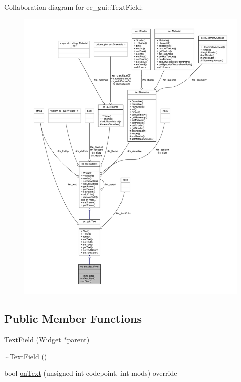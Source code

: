 Collaboration diagram for ec\+\_\+gui\+:\+:Text\+Field\+:\nopagebreak
\begin{figure}[H]
\begin{center}
\leavevmode
\includegraphics[width=350pt]{classec__gui_1_1_text_field__coll__graph}
\end{center}
\end{figure}
\subsection*{Public Member Functions}
\begin{DoxyCompactItemize}
\item 
\mbox{\hyperlink{classec__gui_1_1_text_field_a82c3e427aaa37f5a53a7561ef3d2e58e}{Text\+Field}} (\mbox{\hyperlink{classec__gui_1_1_widget}{Widget}} $\ast$parent)
\item 
\mbox{\hyperlink{classec__gui_1_1_text_field_a9c43ada308dc59b5a8728cc08cd8d8cb}{$\sim$\+Text\+Field}} ()
\item 
bool \mbox{\hyperlink{classec__gui_1_1_text_field_afde8b13045264753e47a4e908240cab1}{on\+Text}} (unsigned int codepoint, int mods) override
\end{DoxyCompactItemize}
